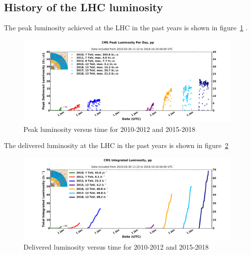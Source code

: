 \documentclass[10pt]{article}
\begin{document}
\subsection{History of the LHC luminosity}
The peak luminosity achieved at the LHC in the past years is shown in figure~\ref{fig:peakLHC} \cite{LHCLumiInCMS}.
\begin{figure}[htbp]
\begin{center}
\includegraphics[width=\textwidth]{peak_lumi_pp.pdf}
\caption{{Peak luminosity versus time for 2010-2012 and 2015-2018}}
\label{fig:peakLHC}
\end{center}
\end{figure}
The delivered luminosity at the LHC in the past years is shown in figure~\ref{fig:deliveredLHC}
\begin{figure}[htbp]
\begin{center}
\includegraphics[width=\textwidth]{int_lumi_cumulative_pp.pdf}
\caption{{Delivered luminosity versus time for 2010-2012 and 2015-2018}}
\label{fig:deliveredLHC}
\end{center}
\end{figure}

%
\end{document}
